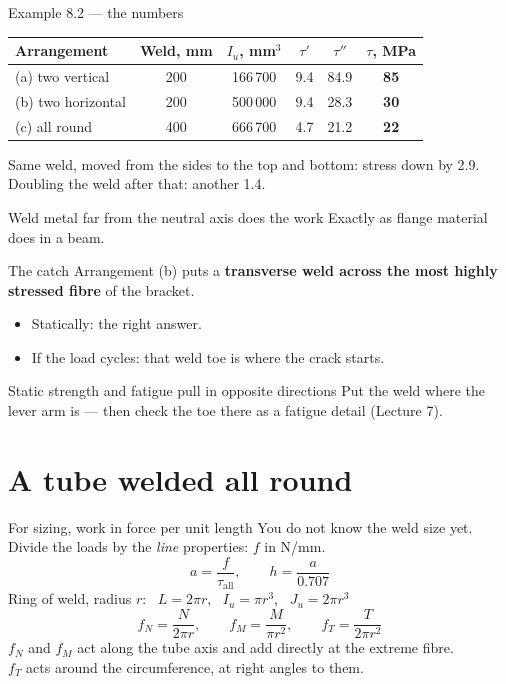 \documentclass[aspectratio=169,10pt]{beamer}
\begin{document}
\begin{frame}{Example 8.2 --- the numbers}
\centering
\renewcommand{\arraystretch}{1.3}
\begin{tabular}{@{}lccccc@{}}
\toprule
Arrangement & Weld, mm & $I_u$, mm$^3$ & $\tau'$ & $\tau''$ & $\tau$, MPa\\
\midrule
(a) two vertical & 200 & 166\,700 & 9.4 & 84.9 & \textbf{85}\\
(b) two horizontal & 200 & 500\,000 & 9.4 & 28.3 & \textbf{30}\\
(c) all round & 400 & 666\,700 & 4.7 & 21.2 & \textbf{22}\\
\bottomrule
\end{tabular}

\vfill
\raggedright
Same weld, moved from the sides to the top and bottom: stress down by \alert{2.9}.\\
Doubling the weld after that: another 1.4.

\medskip
\begin{block}{Weld metal far from the neutral axis does the work}
Exactly as flange material does in a beam.
\end{block}
\end{frame}

\begin{frame}{The catch}
Arrangement (b) puts a \textbf{transverse weld across the most highly stressed fibre} of the bracket.

\medskip
\begin{itemize}
  \item Statically: the right answer.
  \item If the load cycles: that weld toe is where the crack starts.
\end{itemize}
\vfill
\begin{alertblock}{Static strength and fatigue pull in opposite directions}
Put the weld where the lever arm is --- then check the toe there as a fatigue detail (Lecture 7).
\end{alertblock}
\end{frame}

\section{A tube welded all round}

\begin{frame}{For sizing, work in force per unit length}
You do not know the weld size yet. Divide the loads by the \emph{line} properties: $f$ in N/mm.
\[ a=\frac{f}{\tau_{\text{all}}},\qquad h=\frac{a}{0.707} \]
Ring of weld, radius $r$: \ $L=2\pi r$, \ $I_u=\pi r^3$, \ $J_u=2\pi r^3$
\[ f_N=\frac{N}{2\pi r},\qquad f_M=\frac{M}{\pi r^2},\qquad f_T=\frac{T}{2\pi r^2} \]
\vfill
$f_N$ and $f_M$ act along the tube axis and add directly at the extreme fibre.\\
$f_T$ acts around the circumference, at right angles to them.
\end{frame}
\end{document}
